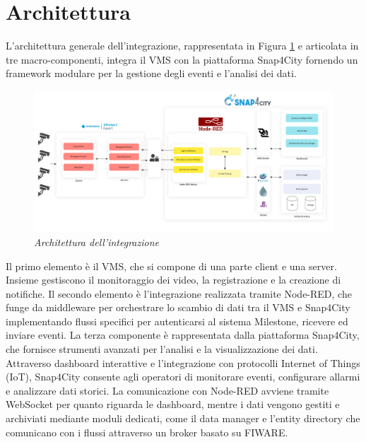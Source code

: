 \documentclass[a4paper, openright, thesis]{report}
\begin{document}
\newpage

\section{Architettura}
L’architettura generale dell'integrazione, rappresentata in Figura \ref{archgen} e articolata in tre macro-componenti, integra il VMS con la piattaforma Snap4City fornendo un framework modulare per la gestione degli eventi e l’analisi dei dati.
\begin{figure}[H]
    \centering
    \includegraphics[width = 1\textwidth]{img/arch_final_HQ.png}
    \caption{\textit{Architettura dell'integrazione}}
    \label{archgen}
\end{figure}
\noindent
Il primo elemento è il VMS, che si compone di una parte client e una server. Insieme gestiscono il monitoraggio dei video, la registrazione e la creazione di notifiche.
Il secondo elemento è l’integrazione realizzata tramite Node-RED, che funge da middleware per orchestrare lo scambio di dati tra il VMS e Snap4City implementando flussi specifici per autenticarsi al sistema Milestone, ricevere ed inviare eventi.
La terza componente è rappresentata dalla piattaforma Snap4City, che fornisce strumenti avanzati per l’analisi e la visualizzazione dei dati. Attraverso dashboard interattive e l’integrazione con protocolli Internet of Things (IoT), Snap4City consente agli operatori di monitorare eventi, configurare allarmi e analizzare dati storici. La comunicazione con Node-RED avviene tramite WebSocket per quanto riguarda le dashboard, mentre i dati vengono gestiti e archiviati mediante moduli dedicati, come il data manager e l’entity directory che comunicano con i flussi attraverso un broker basato su FIWARE.
\end{document}
